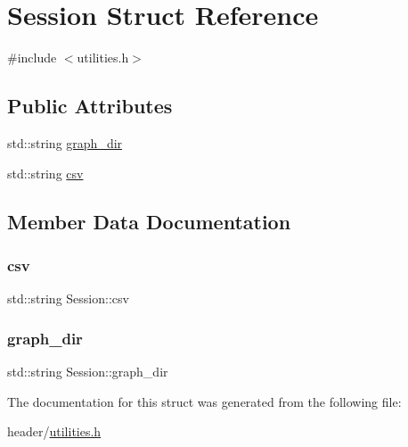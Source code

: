 \hypertarget{struct_session}{}\section{Session Struct Reference}
\label{struct_session}


{\ttfamily \#include $<$utilities.\+h$>$}

\subsection*{Public Attributes}
\begin{DoxyCompactItemize}
\item 
std\+::string \hyperlink{struct_session_aecaa42a56f197e0874041533ccb358a6_aecaa42a56f197e0874041533ccb358a6}{graph\+\_\+dir}
\item 
std\+::string \hyperlink{struct_session_a256b14530b834d61ce85bab451694b8c_a256b14530b834d61ce85bab451694b8c}{csv}
\end{DoxyCompactItemize}


\subsection{Member Data Documentation}
\mbox{\label{struct_session_a256b14530b834d61ce85bab451694b8c_a256b14530b834d61ce85bab451694b8c}} 
\subsubsection{\texorpdfstring{csv}{csv}}
{\footnotesize\ttfamily std\+::string Session\+::csv}

\mbox{\label{struct_session_aecaa42a56f197e0874041533ccb358a6_aecaa42a56f197e0874041533ccb358a6}} 
\subsubsection{\texorpdfstring{graph\+\_\+dir}{graph\_dir}}
{\footnotesize\ttfamily std\+::string Session\+::graph\+\_\+dir}



The documentation for this struct was generated from the following file\+:\begin{DoxyCompactItemize}
\item 
header/\hyperlink{utilities_8h}{utilities.\+h}\end{DoxyCompactItemize}
